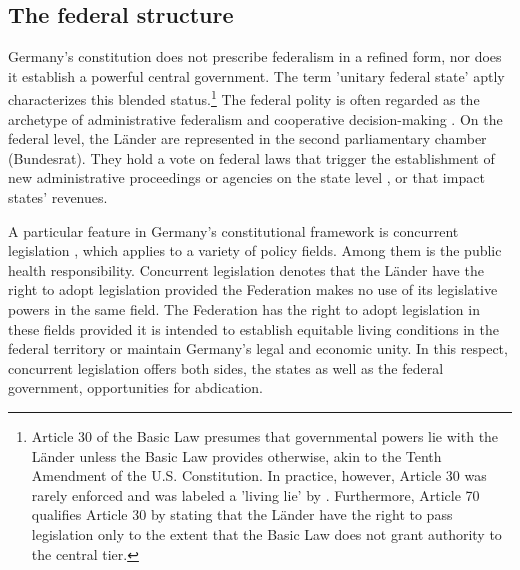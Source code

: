 \documentclass[12pt, abstracton]{scrartcl}
\begin{document}
\subsection[The federal structure]{The federal structure}\label{FederalStructure}
Germany's constitution does not prescribe federalism in a refined form, nor does it establish a powerful central government. The term 'unitary federal state' \citep{Hesse1962, Turner2013} aptly characterizes this blended status.\footnote{
	Article 30 of the Basic Law presumes that governmental powers lie with the Länder unless the Basic Law provides otherwise, akin to the Tenth Amendment of the U.S. Constitution. In practice, however, Article 30 was rarely enforced and was labeled a 'living lie' by \cite{Scharpf1994}. Furthermore, Article 70 qualifies Article 30 by stating that the Länder have the right to pass legislation only to the extent that the Basic Law does not grant authority to the central tier.
} The federal polity is often regarded as the archetype of administrative federalism and cooperative decision-making \citep{Kropp2016}. On the federal level, the Länder are represented in the second parliamentary chamber (Bundesrat). They hold a vote on federal laws that trigger the establishment of new administrative proceedings or agencies on the state level \citep{Burkhart2008}, or that impact states' revenues. %

A particular feature in Germany's constitutional framework is concurrent legislation \citep{Gunlicks2007}, which applies to a variety of policy fields. Among them is the public health responsibility. Concurrent legislation denotes that the Länder have the right to adopt legislation provided the Federation makes no use of its legislative powers in the same field. The Federation has the right to adopt legislation in these fields provided it is intended to establish equitable living conditions in the federal territory or maintain Germany’s legal and economic unity. In this respect, concurrent legislation offers both sides, the states as well as the federal government, opportunities for abdication.
\end{document}
